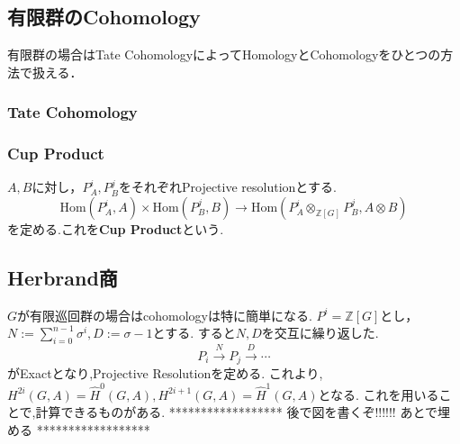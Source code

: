 \documentclass{ujarticle}
\begin{document}
\subsection{有限群のCohomology}
\label{sub:有限群のCohomology}
有限群の場合はTate CohomologyによってHomologyとCohomologyをひとつの方法で扱える．
\subsubsection{Tate Cohomology}
\label{subs:Tate Cohomology}

\subsubsection{Cup Product}
\label{subs:Cup Product}
$A,B$に対し，$P^i_A,P^j_B$をそれぞれProjective resolutionとする.
\begin{equation*}
  \mathrm{Hom}(P^i_A,A) \times \mathrm{Hom}(P^j_B,B) \to \mathrm{Hom}(P^i_A \otimes_{\mathbb{Z}[G]} P^j_B,A \otimes B )
\end{equation*}
を定める.これを\textbf{Cup Product}という.

\subsection{Herbrand商}
\label{sub:Herbrand}
$G$が有限巡回群の場合はcohomologyは特に簡単になる.
$P^i=\mathbb{Z}[G]$とし，$N:=\displaystyle\sum_{i=0}^{n-1}\sigma^i,D:=\sigma-1$とする.
すると$N,D$を交互に繰り返した.
\begin{equation*}
 P_i  \xrightarrow{N} P_j \xrightarrow{D} \cdots
\end{equation*}
がExactとなり,Projective Resolutionを定める.
これより,$H^{2i}(G,A) = \hat{H}^0(G,A),H^{2i+1}(G,A)=\hat{H}^1(G,A)$となる.
これを用いることで,計算できるものがある.
******************
後で図を書くぞ!!!!!!
あとで埋める
******************
\end{document}
